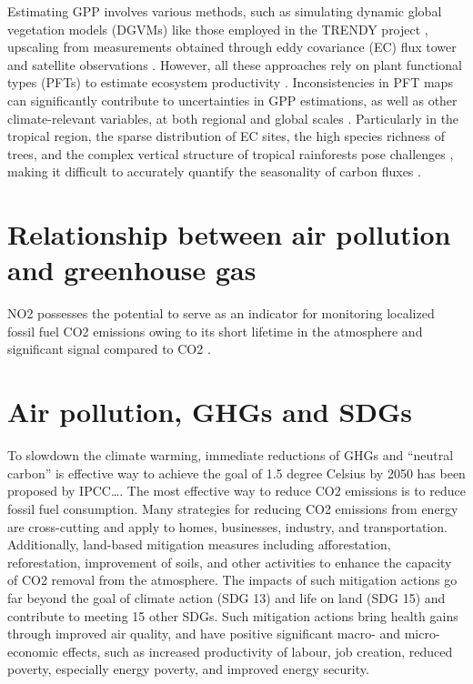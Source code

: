 Estimating GPP involves various methods, such as simulating dynamic global vegetation models (DGVMs) like those employed in the TRENDY project \citep{sitch2015recent, le2018global}, upscaling from measurements obtained through eddy covariance (EC) flux tower and satellite observations \citep{jung2019fluxcom, zeng2020global}. However, all these approaches rely on plant functional types (PFTs) to estimate ecosystem productivity \citep{poulter2011plant, poulter2015plant, lin2021improved, guo2023estimating, yan2023integrating}. Inconsistencies in PFT maps can significantly contribute to uncertainties in GPP estimations, as well as other climate-relevant variables, at both regional and global scales \citep{poulter2011plant}. Particularly in the tropical region, the sparse distribution of EC sites, the high species richness of trees, and the complex vertical structure of tropical rainforests pose challenges \citep{montgomery2001forest}, making it difficult to accurately quantify the seasonality of carbon fluxes \citep{xu2015satellite}. \par

\section{Relationship between air pollution and greenhouse gas}
NO2 possesses the potential to serve as an indicator for monitoring localized fossil fuel CO2 emissions owing to its short lifetime in the atmosphere and significant signal compared to CO2 \citep{miyazaki2023predictability}.\par
\section{Air pollution, GHGs and SDGs}

To slowdown the climate warming, immediate reductions of GHGs and “neutral carbon” is effective way to achieve the goal of 1.5 degree Celsius by 2050 has been proposed by IPCC…. The most effective way to reduce CO2 emissions is to reduce fossil fuel consumption. Many strategies for reducing CO2 emissions from energy are cross-cutting and apply to homes, businesses, industry, and transportation. Additionally, land-based mitigation measures including afforestation, reforestation, improvement of soils, and other activities to enhance the capacity of CO2 removal from the atmosphere. The impacts of such mitigation actions go far beyond the goal of climate action (SDG 13) and life on land (SDG 15) and contribute to meeting 15 other SDGs. Such mitigation actions bring health gains through improved air quality, and have positive significant macro- and micro-economic effects, such as increased productivity of labour, job creation, reduced poverty, especially energy poverty, and improved energy security. \par

